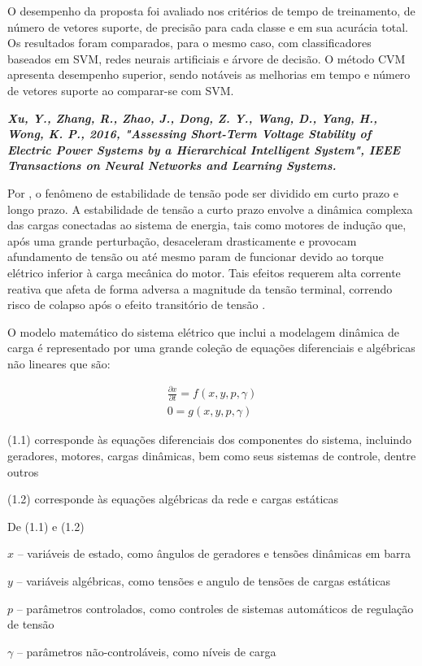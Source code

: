\documentclass[12pt,oneside,a4paper,chapter=TITLE,section=TITLE,sumario=tradicional,english,brazil]{abntex2}
\begin{document}
	O desempenho da proposta foi avaliado nos critérios de tempo de treinamento, de número de vetores suporte, de precisão para cada classe e em sua acurácia total. Os resultados foram comparados, para o mesmo caso, com classificadores baseados em SVM, redes neurais artificiais e árvore de decisão. O método CVM apresenta desempenho superior, sendo notáveis as melhorias em tempo e número de vetores suporte ao comparar-se com SVM.\par 
\textbf{\textit{Xu, Y., Zhang, R., Zhao, J., Dong, Z. Y., Wang, D., Yang, H., Wong, K. P., 2016, "Assessing Short-Term Voltage Stability of Electric Power Systems by a Hierarchical Intelligent System", IEEE Transactions on Neural Networks and Learning Systems.}}	\par
	Por \textcite{kundur1994}, o fenômeno de estabilidade de tensão pode ser dividido em curto prazo e longo prazo. A estabilidade de tensão a curto prazo envolve a dinâmica complexa das cargas conectadas ao sistema de energia, tais como motores de indução que, após uma grande perturbação, desaceleram drasticamente e provocam afundamento de tensão ou até mesmo param de funcionar devido ao torque elétrico inferior à carga mecânica do motor. Tais efeitos requerem alta corrente reativa que afeta de forma adversa a magnitude da tensão terminal, correndo risco de colapso após o efeito transitório de tensão \cites{cutsem1998}{diaz2002}.\par
	O modelo matemático do sistema elétrico que inclui a modelagem dinâmica de carga é representado por uma grande coleção de equações diferenciais e algébricas não lineares que são:\par
	\begin{gather}
	\frac{\partial x}{\partial t}=f(x, y, p, \gamma)\\
	0=g(x, y, p,\gamma)
	\end{gather}
\par 
(1.1) corresponde às equações diferenciais dos componentes do sistema, incluindo geradores, motores, cargas dinâmicas, bem como seus sistemas de controle, dentre outros\par 
(1.2) corresponde às equações algébricas da rede e cargas estáticas\par 
De (1.1) e (1.2)\par 
$x$ -- variáveis de estado, como ângulos de geradores e tensões dinâmicas em barra\par 
$y$ --  variáveis algébricas, como tensões e angulo de tensões de cargas estáticas\par 
$p$ -- parâmetros controlados, como controles de sistemas automáticos de regulação de tensão\par
$\gamma$ -- parâmetros não-controláveis, como níveis de carga\par  
\end{document}
